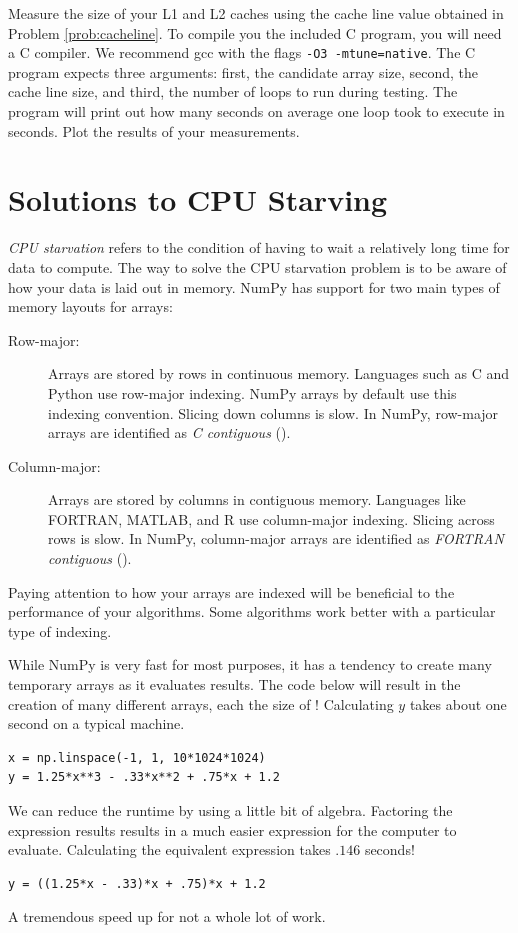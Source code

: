 \begin{problem}
Measure the size of your L1 and L2 caches using the cache line value obtained in
Problem \ref{prob:cacheline}.
To compile you the included C program, you will need a C compiler.
We recommend gcc with the flags \texttt{-O3 -mtune=native}.
The C program expects three arguments: first, the candidate array size, second, the cache line size, and third, the number of loops to run during testing.
The program will print out how many seconds on average one loop took to execute in seconds.
Plot the results of your measurements.
\end{problem}

\section*{Solutions to CPU Starving}
\emph{CPU starvation} refers to the condition of having to wait a relatively long time for data to compute.
The way to solve the CPU starvation problem is to be aware of how your data is laid out in memory.
NumPy has support for two main types of memory layouts for arrays:
\begin{description}
\item[Row-major:] Arrays are stored by rows in continuous memory.
Languages such as C and Python use row-major indexing.  NumPy arrays by default use this indexing convention.
Slicing down columns is slow.  In NumPy, row-major arrays are identified as \emph{C contiguous} ().
\item[Column-major:] Arrays are stored by columns in contiguous memory.
Languages like FORTRAN, MATLAB, and R use column-major indexing.  Slicing across rows is slow.
In NumPy, column-major arrays are identified as \emph{FORTRAN contiguous} ().
\end{description}
Paying attention to how your arrays are indexed will be beneficial to the performance of your algorithms.
Some algorithms work better with a particular type of indexing.

While NumPy is very fast for most purposes, it has a tendency to create many temporary arrays as it evaluates results.
The code below will result in the creation of many different arrays, each the size of !
Calculating $y$ takes about one second on a typical machine.
\begin{lstlisting}
x = np.linspace(-1, 1, 10*1024*1024)
y = 1.25*x**3 - .33*x**2 + .75*x + 1.2
\end{lstlisting}
We can reduce the runtime by using a little bit of algebra.
Factoring the expression results results in a much easier expression for the computer to evaluate.
Calculating the equivalent expression takes $.146$ seconds!
\begin{lstlisting}
y = ((1.25*x - .33)*x + .75)*x + 1.2
\end{lstlisting}
A tremendous speed up for not a whole lot of work.

